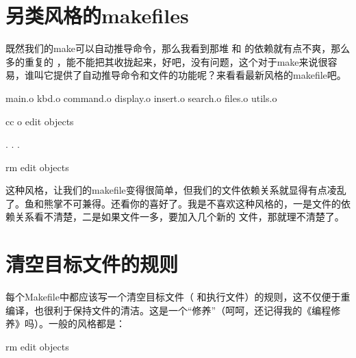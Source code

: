 \documentclass[a4paper,10pt]{sphinxmanual}
\begin{document}
\section{另类风格的makefiles}
\label{\detokenize{introduction:makefiles}}
既然我们的make可以自动推导命令，那么我看到那堆  和  的依赖就有点不爽，那么多的重复的  ，能不能把其收拢起来，好吧，没有问题，这个对于make来说很容易，谁叫它提供了自动推导命令和文件的功能呢？来看看最新风格的makefile吧。

\begin{sphinxVerbatim}[commandchars=\\\{\}]
  main.o kbd.o command.o display.o 
    insert.o search.o files.o utils.o

 
    cc \PYGZhy{}o edit objects

 .
 .
 .

 
    rm edit objects
\end{sphinxVerbatim}

这种风格，让我们的makefile变得很简单，但我们的文件依赖关系就显得有点凌乱了。鱼和熊掌不可兼得。还看你的喜好了。我是不喜欢这种风格的，一是文件的依赖关系看不清楚，二是如果文件一多，要加入几个新的  文件，那就理不清楚了。


\section{清空目标文件的规则}
\label{\detokenize{introduction:id5}}
每个Makefile中都应该写一个清空目标文件（  和执行文件）的规则，这不仅便于重编译，也很利于保持文件的清洁。这是一个“修养”（呵呵，还记得我的《编程修养》吗）。一般的风格都是：

\begin{sphinxVerbatim}[commandchars=\\\{\}]
    rm edit objects
\end{sphinxVerbatim}
\end{document}
